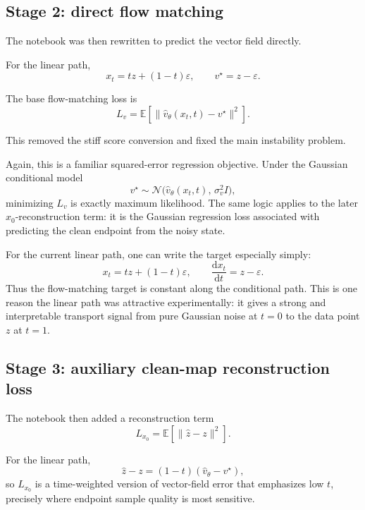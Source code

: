 \documentclass[11pt]{article}
\newcommand{\EE}{\mathbb{E}}
\newcommand{\e}{\varepsilon}
\newcommand{\dd}{\mathrm{d}}
\begin{document}
\subsection{Stage 2: direct flow matching}

The notebook was then rewritten to predict the vector field directly.

For the linear path,
\begin{equation}
  x_t = t z + (1-t)\e,
  \qquad
  v^\star = z-\e.
\end{equation}

The base flow-matching loss is
\begin{equation}
  L_v
  =
  \EE \left[
    \|\hat v_\theta(x_t,t)-v^\star\|^2
  \right].
\end{equation}

This removed the stiff score conversion and fixed the main instability problem.

Again, this is a familiar squared-error regression objective. Under the Gaussian conditional model
\begin{equation}
  v^\star \sim \mathcal N\bigl(\hat v_\theta(x_t,t),\,\sigma_v^2 I\bigr),
\end{equation}
minimizing \(L_v\) is exactly maximum likelihood. The same logic applies to the later \(x_0\)-reconstruction term: it is the Gaussian regression loss associated with predicting the clean endpoint from the noisy state.

For the current linear path, one can write the target especially simply:
\begin{equation}
  x_t = t z + (1-t)\e,
  \qquad
  \frac{\dd x_t}{\dd t} = z-\e.
\end{equation}
Thus the flow-matching target is constant along the conditional path. This is one reason the linear path was attractive experimentally: it gives a strong and interpretable transport signal from pure Gaussian noise at \(t=0\) to the data point \(z\) at \(t=1\).

\subsection{Stage 3: auxiliary clean-map reconstruction loss}

The notebook then added a reconstruction term
\begin{equation}
  L_{x_0}
  =
  \EE \left[
    \|\hat z - z\|^2
  \right].
\end{equation}

For the linear path,
\begin{equation}
  \hat z - z = (1-t)(\hat v_\theta - v^\star),
\end{equation}
so \(L_{x_0}\) is a time-weighted version of vector-field error that emphasizes low \(t\), precisely where endpoint sample quality is most sensitive.
\end{document}
